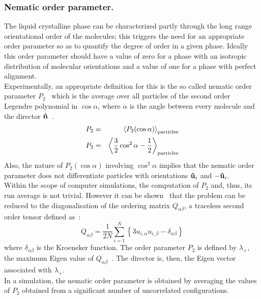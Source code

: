 \subsubsection{Nematic order parameter.}

The liquid crystalline phase can be characterized partly through the long range orientational
order of the molecules; this triggers the need for an appropriate order parameter so as to
quantify the degree of order in a given phase. Ideally this order parameter should have a value
of zero for a phase with an isotropic distribution of molecular orientations and a value of 
one for a phase with perfect alignment.\\

Experimentally, an appropriate definition for this is the so called nematic order parameter
$P_2$~\cite{Intro_LC} which is the average over all particles of the second order Legendre polynomial 
in $\cos\alpha$, where $\alpha$ is the angle between every molecule and the 
director $\mathbf{\hat{n} }$~\cite{Intro_LC}.
\begin{eqnarray}
	P_2 &=& \left< P_2(\cos\alpha)  \right>_{\mathrm{particles}}	\\
	P_2 &=& \left< \frac{3}{2}\cos^2\alpha - \frac{1}{2} \right>_{\mathrm{particles}}
\end{eqnarray}
Also, the nature of $P_2(\cos\alpha)$ involving $\cos^2\alpha$ implies that the nematic order
parameter does not differentiate particles with orientations $\mathbf{\hat{u} }_i$ and $-\mathbf{\hat{u} }_i$.\\

Within the scope of computer simulations, the computation of $P_2$ and, thus, its run average
\Ptwo is not trivial. However it can be shown~\cite{EppengaFrenkel84,AdvCpuSimsLiqCryst2}
that the problem can be reduced to the diagonalisation of the ordering matrix 
$Q_{\alpha\beta}$, a traceless second order tensor defined as~:
%
\begin{equation}
	Q_{\alpha\beta} = \frac{1}{2N}\sum_{i=1}^{N} \left\{ 
		3u_{i,\alpha}u_{i,\beta} - \delta_{\alpha\beta} \right\}
\end{equation}
%
where $\delta_{\alpha\beta}$ is the Kroeneker function. The order parameter $P_2$ is defined 
by $\lambda_+$, the maximum Eigen value of $Q_{\alpha\beta}$~\cite{EppengaFrenkel84}. 
The director is, then, the Eigen vector associated with $\lambda_+$.\\
%
In a simulation, the nematic order parameter \Ptwo is obtained by averaging the values of 
$P_2$ obtained from a significant number of uncorrelated configurations.\\

